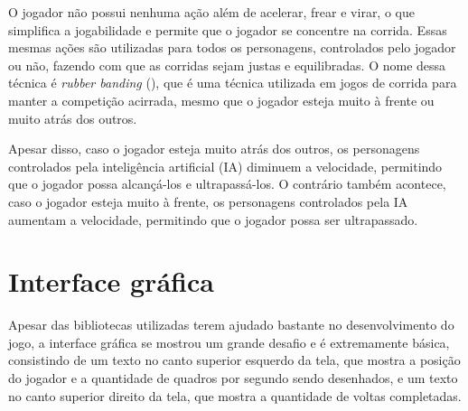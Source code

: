 O jogador não possui nenhuma ação além de acelerar, frear e virar, o que simplifica a jogabilidade e permite que o jogador se concentre na corrida. Essas mesmas ações são utilizadas para todos os personagens, controlados pelo jogador ou não, fazendo com que as corridas sejam justas e equilibradas. O nome dessa técnica é \textit{rubber banding} (\cite{rubberBandAi}), que é uma técnica utilizada em jogos de corrida para manter a competição acirrada, mesmo que o jogador esteja muito à frente ou muito atrás dos outros.

Apesar disso, caso o jogador esteja muito atrás dos outros, os personagens controlados pela inteligência artificial (IA) diminuem a velocidade, permitindo que o jogador possa alcançá-los e ultrapassá-los. O contrário também acontece, caso o jogador esteja muito à frente, os personagens controlados pela IA aumentam a velocidade, permitindo que o jogador possa ser ultrapassado.

\section{Interface gráfica}

Apesar das bibliotecas utilizadas terem ajudado bastante no desenvolvimento do jogo, a interface gráfica se mostrou um grande desafio e é extremamente básica, consistindo de um texto no canto superior esquerdo da tela, que mostra a posição do jogador e a quantidade de quadros por segundo sendo desenhados, e um texto no canto superior direito da tela, que mostra a quantidade de voltas completadas.